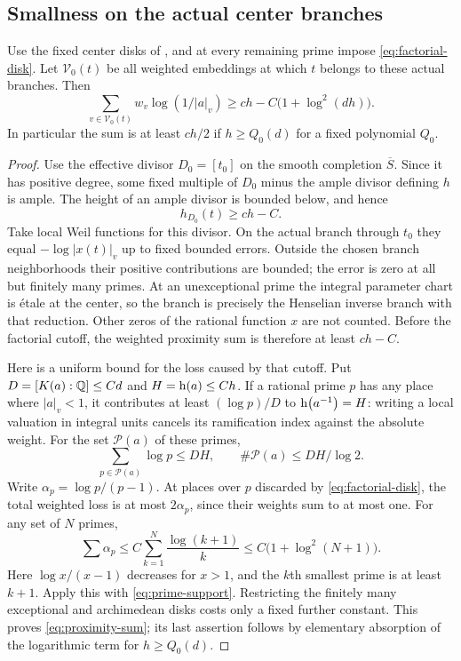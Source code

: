 \subsection{Smallness on the actual center branches}

\begin{lemma}\label{lem:proximity}
Use the fixed center disks of ,
and at every remaining prime impose \eqref{eq:factorial-disk}.
Let $\mathcal V_0(t)$ be all weighted embeddings at which $t$
belongs to these actual branches.  Then
\begin{equation}\label{eq:proximity-sum}
 \sum_{v\in\mathcal V_0(t)}w_v\log(1/|a|_v)
       \ge c h-C\bigl(1+\log^2(dh)\bigr).
\end{equation}
In particular the sum is at least $c h/2$ if $h\ge Q_0(d)$
for a fixed polynomial $Q_0$.
\end{lemma}

\begin{proof}
Use the effective divisor $D_0=[t_0]$ on the smooth completion
$\overline S$.  Since it has positive degree, some fixed multiple
of $D_0$ minus the ample divisor defining $h$ is ample.  The
height of an ample divisor is bounded below, and hence
\[
 h_{D_0}(t)\ge c h-C.
\]
Take local Weil functions for this divisor.  On the actual
branch through $t_0$ they equal $-\log|x(t)|_v$ up to fixed
bounded errors.  Outside the chosen branch neighborhoods their
positive contributions are bounded; the error is zero at all
but finitely many primes.  At an unexceptional prime the
integral parameter chart is \'etale at the center, so the branch
is precisely the Henselian inverse branch with that reduction.
Other zeros of the rational function $x$ are not counted.
Before the factorial cutoff, the weighted proximity sum is
therefore at least $ch-C$.

Here is a uniform bound for the loss caused by that cutoff.  Put
$D=[K(a):\mathbb Q]\le Cd$ and $H=\mathrm h\!\left(a\right)\le Ch$.  If a rational prime
$p$ has any place where $|a|_v<1$, it contributes at least
$(\log p)/D$ to $\mathrm h\!\left(a^{-1}\right)=H$: writing a local valuation in
integral units cancels its ramification index against the
absolute weight.  For the set $\mathcal P(a)$ of these primes,
\begin{equation}\label{eq:prime-support}
 \sum_{p\in\mathcal P(a)}\log p\le DH,
 \qquad \#\mathcal P(a)\le DH/\log2.
\end{equation}
Write $\alpha_p=\log p/(p-1)$.  At places over $p$ discarded
by \eqref{eq:factorial-disk}, the total weighted loss is at
most $2\alpha_p$, since their weights sum to at most one.
For any set of $N$ primes,
\[
 \sum\alpha_p
 \le C\sum_{k=1}^{N}\frac{\log(k+1)}k
 \le C\bigl(1+\log^2(N+1)\bigr).
\]
Here $\log x/(x-1)$ decreases for $x>1$, and the $k$th
smallest prime is at least $k+1$.  Apply this with
\eqref{eq:prime-support}.  Restricting the finitely many
exceptional and archimedean disks costs only a fixed further
constant.  This proves \eqref{eq:proximity-sum}; its last
assertion follows by elementary absorption of the logarithmic
term for $h\ge Q_0(d)$.
\end{proof}

